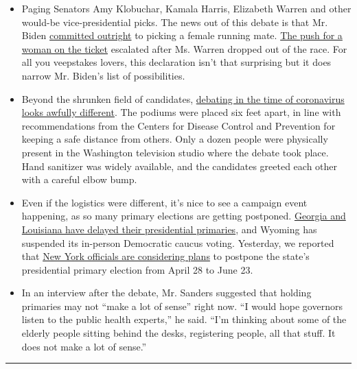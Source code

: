 \begin{itemize}
\item
  Paging Senators Amy Klobuchar, Kamala Harris, Elizabeth Warren and
  other would-be vice-presidential picks. The news out of this debate is
  that Mr. Biden
  \href{https://www.nytimes.com/2020/03/15/us/politics/joe-biden-female-vice-president.html}{committed
  outright} to picking a female running mate.
  \href{https://www.nytimes.com/2020/03/09/us/politics/democrats-women-vice-president.html}{The
  push for a woman on the ticket} escalated after Ms. Warren dropped out
  of the race. For all you veepstakes lovers, this declaration isn't
  that surprising but it does narrow Mr. Biden's list of possibilities.
\item
  Beyond the shrunken field of candidates,
  \href{https://www.nytimes.com/2020/03/15/us/politics/cnn-democratic-debate-coronavirus.html}{debating
  in the time of coronavirus looks awfully different}. The podiums were
  placed six feet apart, in line with recommendations from the Centers
  for Disease Control and Prevention for keeping a safe distance from
  others. Only a dozen people were physically present in the Washington
  television studio where the debate took place. Hand sanitizer was
  widely available, and the candidates greeted each other with a careful
  elbow bump.
\item
  Even if the logistics were different, it's nice to see a campaign
  event happening, as so many primary elections are getting postponed.
  \href{https://www.nytimes.com/article/2020-campaign-primary-calendar-coronavirus.html}{Georgia
  and Louisiana have delayed their presidential primaries}, and Wyoming
  has suspended its in-person Democratic caucus voting. Yesterday, we
  reported that
  \href{https://www.nytimes.com/2020/03/15/us/politics/ny-voting-coronavirus.html}{New
  York officials are considering plans} to postpone the state's
  presidential primary election from April 28 to June 23.
\item
  In an interview after the debate, Mr. Sanders suggested that holding
  primaries may not ``make a lot of sense'' right now. ``I would hope
  governors listen to the public health experts,'' he said. ``I'm
  thinking about some of the elderly people sitting behind the desks,
  registering people, all that stuff. It does not make a lot of sense.''
\end{itemize}

\begin{center}\rule{0.5\linewidth}{\linethickness}\end{center}

